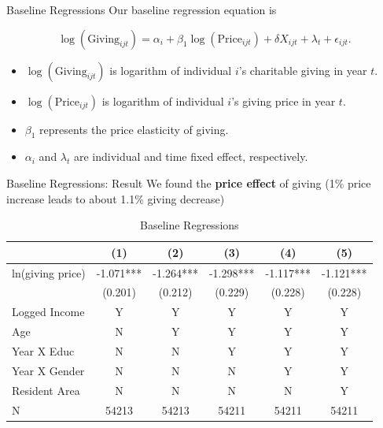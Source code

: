 \documentclass[
  ignorenonframetext,
]{beamer}
\providecommand{\tightlist}{%
  \setlength{\itemsep}{0pt}\setlength{\parskip}{0pt}}
\begin{document}
\begin{frame}{Baseline Regressions}
\protect\hypertarget{baseline-regressions}{}
Our baseline regression equation is

\[
    \log(\text{Giving}_{ijt}) = 
    \alpha_i + \beta_1 \log(\text{Price}_{ijt}) + \delta X_{ijt} + \lambda_t + \epsilon_{ijt}.
\]

\begin{itemize}
\tightlist
\item
  \(\log(\text{Giving}_{ijt})\) is logarithm of individual \(i\)'s
  charitable giving in year \(t\).
\item
  \(\log(\text{Price}_{ijt})\) is logarithm of individual \(i\)'s giving
  price in year \(t\).
\item
  \(\beta_1\) represents the price elasticity of giving.
\item
  \(\alpha_i\) and \(\lambda_t\) are individual and time fixed effect,
  respectively.
\end{itemize}
\end{frame}

\begin{frame}{Baseline Regressions: Result}
\protect\hypertarget{baseline-regressions-result}{}
We found the \textbf{price effect} of giving (1\% price increase leads
to about 1.1\% giving decrease)

\begin{table}

\caption{\label{tab:kableEstimateElasticity}Baseline Regressions}
\centering
\fontsize{9}{11}\selectfont
\begin{tabular}[t]{lccccc}
\toprule
 & (1) & (2) & (3) & (4) & (5)\\
\midrule
ln(giving price) & -1.071*** & -1.264*** & -1.298*** & -1.117*** & -1.121***\\
 & (0.201) & (0.212) & (0.229) & (0.228) & (0.228)\\
Logged Income & Y & Y & Y & Y & Y\\
Age & N & Y & Y & Y & Y\\
Year X Educ & N & N & Y & Y & Y\\
Year X Gender & N & N & N & Y & Y\\
Resident Area & N & N & N & N & Y\\
N & 54213 & 54213 & 54211 & 54211 & 54211\\
\bottomrule
\end{tabular}
\end{table}
\end{frame}
\end{document}
